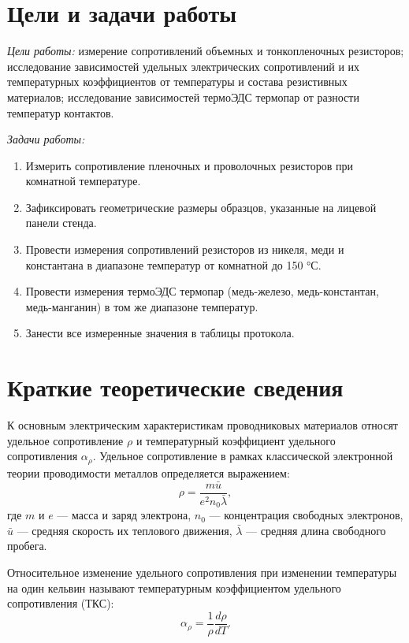 \section*{Цели и задачи работы}

\textit{Цели работы:} измерение сопротивлений объемных и тонкопленочных резисторов; исследование зависимостей удельных электрических сопротивлений и их температурных коэффициентов от температуры и состава резистивных материалов; исследование зависимостей термоЭДС термопар от разности температур контактов.

\textit{Задачи работы:}
\begin{enumerate}
    \item Измерить сопротивление пленочных и проволочных резисторов при комнатной температуре.
    \item Зафиксировать геометрические размеры образцов, указанные на лицевой панели стенда.
    \item Провести измерения сопротивлений резисторов из никеля, меди и константана в диапазоне температур от комнатной до 150 °С.
    \item Провести измерения термоЭДС термопар (медь-железо, медь-константан, медь-манганин) в том же диапазоне температур.
    \item Занести все измеренные значения в таблицы протокола.
\end{enumerate}

\section*{Краткие теоретические сведения}

К основным электрическим характеристикам проводниковых материалов относят удельное сопротивление $\rho$ и температурный коэффициент удельного сопротивления $\alpha_\rho$. Удельное сопротивление в рамках классической электронной теории проводимости металлов определяется выражением:
\begin{equation}
    \rho = \frac{m\bar{u}}{e^2 n_0 \bar{\lambda}},
    \label{eq:rho_def}
\end{equation}
где $m$ и $e$ — масса и заряд электрона, $n_0$ — концентрация свободных электронов, $\bar{u}$ — средняя скорость их теплового движения, $\bar{\lambda}$ — средняя длина свободного пробега.

Относительное изменение удельного сопротивления при изменении температуры на один кельвин называют температурным коэффициентом удельного сопротивления (ТКС):
\begin{equation}
    \alpha_\rho = \frac{1}{\rho}\frac{d\rho}{dT}.
    \label{eq:tcs_def}
\end{equation}

